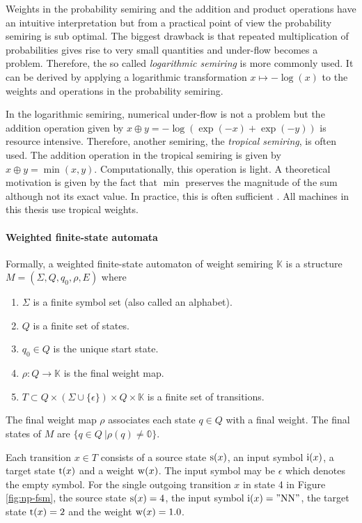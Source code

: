 Weights in the probability semiring and the addition and product operations have an intuitive interpretation but from a practical point of view the probability semiring is sub optimal. The biggest drawback is that repeated multiplication of probabilities gives rise to very small quantities and under-flow becomes a problem. Therefore, the so called {\it logarithmic semiring} is more commonly used. It can be derived by applying a logarithmic transformation $x \mapsto -\log(x)$ to the weights and operations in the probability semiring. 

In the logarithmic semiring, numerical under-flow is not a problem but
the addition operation given by $x \oplus y = -\log(\exp(-x) +
\exp(-y))$ is resource intensive. Therefore, another semiring, the
{\it tropical semiring}, is often used. The addition operation in the
tropical semiring is given by $x \oplus y = \min(x,
y)$. Computationally, this operation is light. A theoretical
motivation is given by the fact that $\min$ preserves the magnitude of
the sum although not its exact value. In practice, this is often
sufficient \cite{?}. All machines in this thesis use tropical
weights.

\paragraph{Weighted finite-state automata} Formally, a weighted
finite-state automaton of weight semiring $\mathbb{K}$ is a structure
$M = (\Sigma, Q, q_0, \rho, E)$ where
\begin{enumerate}
\item $\Sigma$ is a finite symbol set (also called an alphabet).
\item $Q$ is a finite set of states.
\item $q_0 \in Q$ is the unique start state.
\item $\rho: Q \rightarrow \mathbb{K}$ is the final weight map.
\item $T \subset Q \times (\Sigma \cup \{\epsilon\}) \times Q \times
\mathbb{K} $ is a finite set of transitions.
\end{enumerate}

The final weight map $\rho$ associates each state $q \in Q$ with a final weight. The final states of $M$ are $\{q \in Q\ | \rho(q) \ne \mathbb{0}\}$.

Each transition $x \in T$ consists of a source state $\mbox{${\rm s}$}(x)$, an input symbol $\mbox{${\rm i}$}(x)$, a target state $\mbox{${\rm t}$}(x)$ and a weight $\mbox{${\rm w}$}(x)$. The input symbol may be $\epsilon$ which denotes the empty symbol. For the single outgoing transition $x$ in state 4 in Figure \ref{fig:np-fsm}, the source state $\mbox{${\rm s}$}(x) = 4$, the input symbol $\mbox{${\rm i}$}(x) = {\rm "NN"}$, the target state $\mbox{${\rm t}$}(x) = 2$ and the weight $\mbox{${\rm w}$}(x) = 1.0$.

